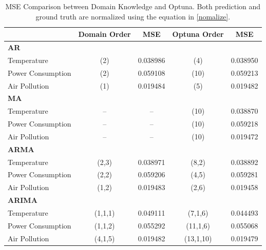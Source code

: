 \documentclass{scrartcl}
\begin{document}
\begin{table}[h!]
\centering
\begin{tabular}{@{}lcccc@{}}
\toprule
\textbf{}               & \textbf{Domain Order}           & \textbf{MSE}     & \textbf{Optuna Order} & \textbf{MSE}     \\ \midrule
\textbf{AR}             &                                 &                  &                       &                  \\
Temperature             & (2)                             & 0.038986         & (4)                   & 0.038950         \\
Power Consumption       & (2)                             & 0.059108         & (10)                  & 0.059213         \\
Air Pollution           & (1)                             & 0.019484         & (5)                   & 0.019482         \\ \midrule
\textbf{MA}               &                                 &                  &                       &                  \\
Temperature             & --                              & --               & (10)                  & 0.038870         \\
Power Consumption       & --                              & --               & (10)                  & 0.059218         \\
Air Pollution           & --                              & --               & (10)                  & 0.019472         \\ \midrule
\textbf{ARMA}             &                                 &                  &                       &                  \\
Temperature             & (2,3)                           & 0.038971         & (8,2)                 & 0.038892         \\
Power Consumption       & (2,2)                           & 0.059206         & (4,5)                 & 0.059281         \\
Air Pollution           & (1,2)                           & 0.019483         & (2,6)                 & 0.019458         \\ \midrule
\textbf{ARIMA}            &                                 &                  &                       &                  \\
Temperature             & (1,1,1)                         & 0.049111         & (7,1,6)               & 0.044493         \\
Power Consumption       & (1,1,2)                         & 0.055292         & (11,1,6)              & 0.055068         \\
Air Pollution           & (4,1,5)                         & 0.019482         & (13,1,10)             & 0.019479         \\ \bottomrule
\end{tabular}
\caption{MSE Comparison between Domain Knowledge and Optuna. Both prediction and ground truth are normalized using the equation in \ref{nomalize}.}
\label{tab:optuna}
\end{table}
\end{document}
